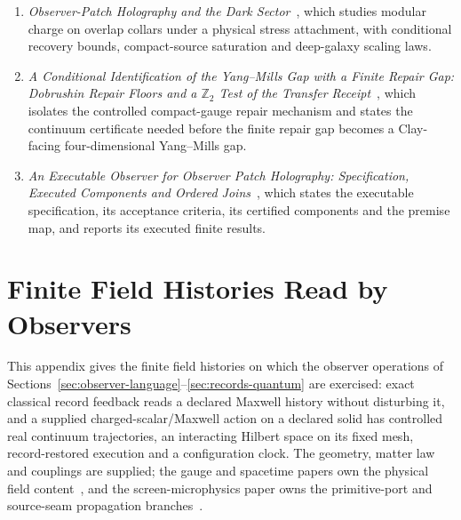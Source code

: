 \documentclass[11pt]{article}
\begin{document}
\begin{enumerate}[leftmargin=2em]
\item \emph{Observer-Patch Holography and the Dark Sector}~\cite{ophdarkmatter}, which studies modular charge on overlap collars under a physical stress attachment, with conditional recovery bounds, compact-source saturation and deep-galaxy scaling laws.
\item \emph{A Conditional Identification of the Yang--Mills Gap with a Finite Repair Gap: Dobrushin Repair Floors and a \(\mathbb Z_2\) Test of the Transfer Receipt}~\cite{ophyangmills}, which isolates the controlled compact-gauge repair mechanism and states the continuum certificate needed before the finite repair gap becomes a Clay-facing four-dimensional Yang--Mills gap.
\item \emph{An Executable Observer for Observer Patch Holography: Specification, Executed Components and Ordered Joins}~\cite{ophmodel}, which states the executable specification, its acceptance criteria, its certified components and the premise map, and reports its executed finite results.
\end{enumerate}

\def\OPHSkipEmbeddedReferences{1}


\appendix
\section{Finite Field Histories Read by Observers}
\label{app:field-histories}

This appendix gives the finite field histories on which the observer
operations of Sections~\ref{sec:observer-language}--\ref{sec:records-quantum}
are exercised: exact classical record feedback reads a declared Maxwell
history without disturbing it, and a supplied charged-scalar/Maxwell action
on a declared solid has controlled real continuum trajectories, an
interacting Hilbert space on its fixed mesh, record-restored execution and a
configuration clock. The geometry, matter law and couplings are supplied; the
gauge and spacetime papers own the physical field
content~\cite{ophGauge,ophEinstein}, and the screen-microphysics paper owns the
primitive-port and source-seam propagation branches~\cite{ophmicrophysics}.
\end{document}
